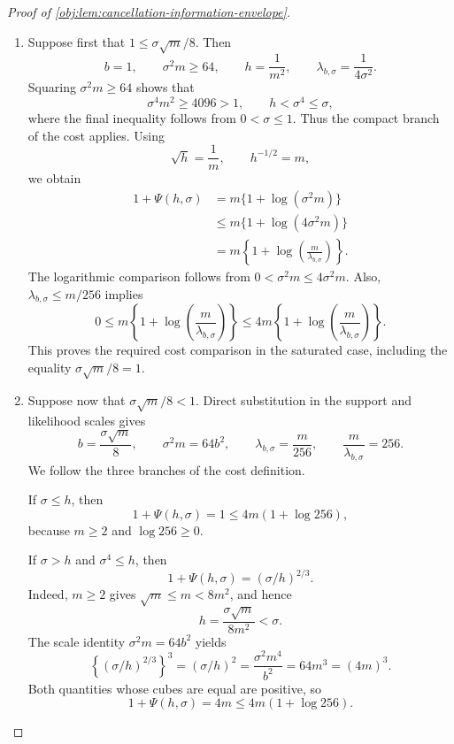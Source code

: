 \begin{proof}[Proof of \cref{obj:lem:cancellation-information-envelope}]
\begin{enumerate}
\item Suppose first that \(1\le\sigma\sqrt m/8\). Then
\[
b=1,\qquad
\sigma^2m\ge64,\qquad
h=\frac1{m^2},\qquad
\lambda_{b,\sigma}=\frac1{4\sigma^2}.
\]
Squaring \(\sigma^2m\ge64\) shows that
\[
\sigma^4m^2\ge4096>1,
\qquad
h<\sigma^4\le\sigma,
\]
where the final inequality follows from \(0<\sigma\le1\).
Thus the compact branch of the cost applies. Using
\[
\sqrt h=\frac1m,\qquad h^{-1/2}=m,
\]
we obtain
\[
\begin{aligned}
1+\Psi(h,\sigma)
&=m\{1+\log(\sigma^2m)\}\\
&\le m\{1+\log(4\sigma^2m)\}\\
&=m\left\{1+\log\!\left(\frac{m}{\lambda_{b,\sigma}}\right)\right\}.
\end{aligned}
\]
The logarithmic comparison follows from
\(0<\sigma^2m\le4\sigma^2m\).
Also, \(\lambda_{b,\sigma}\le m/256\) implies
\[
0\le
m\left\{1+\log\!\left(\frac{m}{\lambda_{b,\sigma}}\right)\right\}
\le
4m\left\{1+\log\!\left(\frac{m}{\lambda_{b,\sigma}}\right)\right\}.
\]
This proves the required cost comparison in the saturated case, including the equality \(\sigma\sqrt m/8=1\).

\item Suppose now that \(\sigma\sqrt m/8<1\). Direct substitution in the support and likelihood scales gives
\[
b=\frac{\sigma\sqrt m}{8},
\qquad
\sigma^2m=64b^2,
\qquad
\lambda_{b,\sigma}=\frac m{256},
\qquad
\frac{m}{\lambda_{b,\sigma}}=256.
\]
We follow the three branches of the cost definition.

If \(\sigma\le h\), then
\[
1+\Psi(h,\sigma)=1
\le4m(1+\log256),
\]
because \(m\ge2\) and \(\log256\ge0\).

If \(\sigma>h\) and \(\sigma^4\le h\), then
\[
1+\Psi(h,\sigma)=(\sigma/h)^{2/3}.
\]
Indeed, \(m\ge2\) gives \(\sqrt m\le m<8m^2\), and hence
\[
h=\frac{\sigma\sqrt m}{8m^2}<\sigma.
\]
The scale identity \(\sigma^2m=64b^2\) yields
\[
\left\{(\sigma/h)^{2/3}\right\}^{3}
=(\sigma/h)^2
=\frac{\sigma^2m^4}{b^2}
=64m^3=(4m)^3.
\]
Both quantities whose cubes are equal are positive, so
\[
1+\Psi(h,\sigma)=4m\le4m(1+\log256).
\]


\end{enumerate}
\end{proof}
